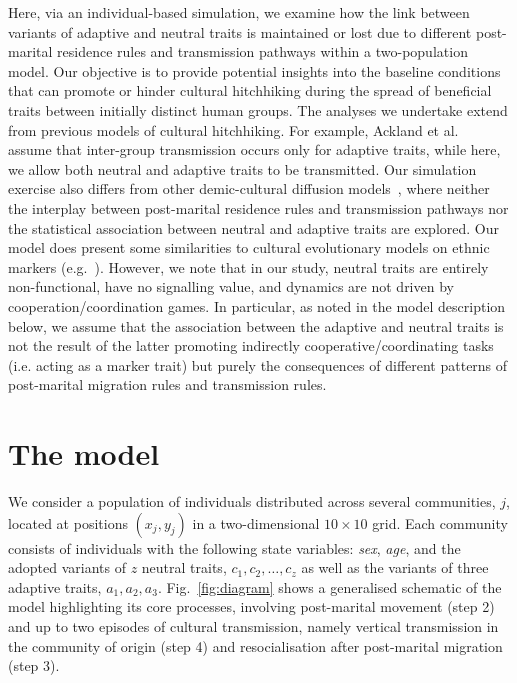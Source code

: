 \documentclass[9pt,twocolumn,twoside,lineno]{pnas-new}
\begin{document}
Here, via an individual-based simulation, we examine how the link between variants of adaptive and neutral traits is maintained or lost due to different post-marital residence rules and transmission pathways within a two-population model. 
Our objective is to provide potential insights into the baseline conditions that can promote or hinder cultural hitchhiking during the spread of beneficial traits between initially distinct human groups.
The analyses we undertake extend from previous models of cultural hitchhiking. For example, Ackland et al.~\citep{ackland_cultural_2007} assume that inter-group transmission occurs only for adaptive traits, while here, we allow both neutral and adaptive traits to be transmitted. 
Our simulation exercise also differs from other demic-cultural diffusion models~\citep[e.g.][]{fort_synthesis_2012}, where neither the interplay between post-marital residence rules and transmission pathways nor the statistical association between neutral and adaptive traits are explored.
Our model does present some similarities to cultural evolutionary models on ethnic markers (e.g.~\citep{boyd_evolution-ethincethnic-markers_1987,mcelreath_share-norm_2003}). 
However, we note that in our study, neutral traits are entirely non-functional, have no signalling value, and dynamics are not driven by cooperation/coordination games. 
In particular, as noted in the model description below, we assume that the association between the adaptive and neutral traits is not the result of the latter promoting indirectly cooperative/coordinating tasks (i.e. acting as a marker trait) but purely the consequences of different patterns of post-marital migration rules and transmission rules.  


\section*{The model}

We consider a population of individuals distributed across several communities, $j$, located at positions $(x_j,y_j)$ in a two-dimensional $10\times10$ grid. 
Each community consists of individuals with the following state variables: \textit{sex}, \textit{age}, and the adopted variants of $z$ neutral traits, $c_1,c_2,\ldots,c_z$ as well as the variants of three adaptive traits, $a_1,a_2,a_3$.
Fig.~\ref{fig:diagram} shows a generalised schematic of the model highlighting its core processes, involving post-marital movement (step 2) and up to two episodes of cultural transmission, namely vertical transmission in the community of origin (step 4) and resocialisation after post-marital migration (step 3).   
\end{document}
